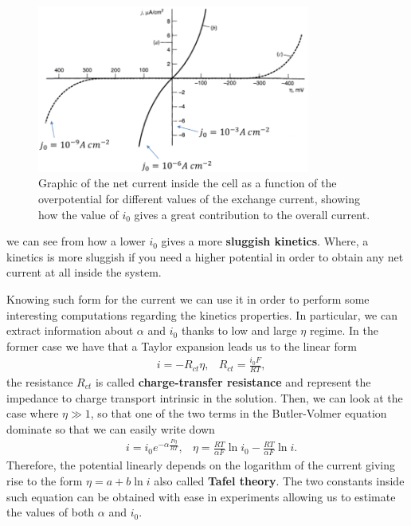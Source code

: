 \begin{figure}[t]
    \centering
    \includegraphics[width=0.8\textwidth]{Immagini/CurrentTrans.png}
    \caption{
        Graphic of the net current inside the cell as a function of the overpotential for different values of the exchange current, showing how the value of $i_0$ gives a great contribution to the overall current.
    }
    \label{eq:CurrentTrans}
\end{figure}
we can see from  how a lower $i_0$ gives a more \textbf{sluggish kinetics}. Where, a kinetics is more sluggish if you need a higher potential in order to obtain any net current at all inside the system.

Knowing such form for the current we can use it in order to perform some interesting computations regarding the kinetics properties. In particular, we can extract information about $\alpha$ and $i_0$ thanks to low and large $\eta$ regime. In the former case we have that a Taylor expansion leads us to the linear form
\begin{align}
    &i = -R_{ct}\eta, &R_{ct} = \frac{i_0 F}{RT},
\end{align}
the resistance $R_{ct}$ is called \textbf{charge-transfer resistance} and represent the impedance to charge transport intrinsic in the solution. Then, we can look at the case where $\eta \gg 1$, so that one of the two terms in the Butler-Volmer equation dominate so that we can easily write down
\begin{align}
    &i = i_0 e^{-\alpha \frac{F\eta}{RT}}, &\eta = \frac{RT}{\alpha F} \ln i_0 - \frac{RT}{\alpha F}\ln i.
\end{align}
Therefore, the potential linearly depends on the logarithm of the current giving rise to the form $\eta = a + b \ln i$ also called \textbf{Tafel theory}. The two constants inside such equation can be obtained with ease in experiments allowing us to estimate the values of both $\alpha$ and $i_0$.

